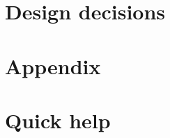\documentclass[10pt,a4paper,twoside]{book}
\begin{document}
% 
% 
%   
% 
%   
%   
%   
% 
% 
%  
%   
%   
%   
% 
% 
% 
%   
%   
%   
%   
%   
%   
%   
%   
%   
%  
%

 \part{Design decisions}
 \newpage
 



  
 \appendix 
 \part{Appendix}

 
 \newpage
 
%  
 \newpage
 
 \newpage
 
 
 \part{Quick help}

 
 \newpage
 
\end{document}
